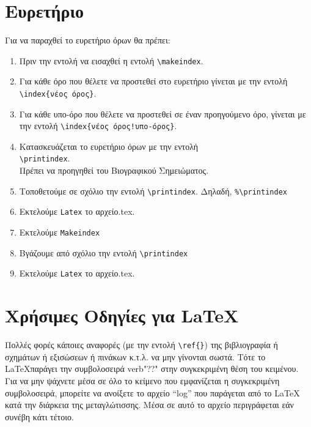 \color{red}
\section{Ευρετήριο}
\label{sec:Index}

Για να παραχθεί το ευρετήριο όρων θα πρέπει:

\begin{enumerate}
  \item Πριν την εντολή \verb"" να εισαχθεί η
  εντολή \verb"\makeindex".
  \item Για κάθε όρο που θέλετε να προστεθεί στο ευρετήριο γίνεται
  με την εντολή \verb"\index{νέος όρος}".
  \item Για κάθε υπο-όρο που θέλετε να προστεθεί σε έναν προηγούμενο όρο, γίνεται
  με την εντολή \verb"\index{νέος όρος!υπο-όρος}".
  \item Κατασκευάζεται το ευρετήριο όρων με την εντολή\\
  \verb"\printindex". \\Πρέπει να προηγηθεί του Βιογραφικού
  Σημειώματος.
  \item Τοποθετούμε σε σχόλιο την εντολή
  \verb"\printindex". Δηλαδή,
  \verb"%\printindex"
  \item Εκτελούμε
  \verb"Latex" το αρχείο.tex.
  \item Εκτελούμε
  \verb"Makeindex"
  \item Βγάζουμε από σχόλιο την εντολή
  \verb"\printindex"
  \item Εκτελούμε
  \verb"Latex" το αρχείο.tex.
\end{enumerate}






\section{Χρήσιμες Οδηγίες για \LaTeX}
\label{sec:LaTeX}

Πολλές φορές κάποιες αναφορές (με την εντολή \verb"\ref{}") της
βιβλιογραφία ή σχημάτων ή εξισώσεων ή πινάκων κ.τ.λ. να μην
γίνονται σωστά. Τότε το \LaTeX παράγει την συμβολοσειρά verb"??"
στην συγκεκριμένη θέση του κειμένου. Για να μην ψάχνετε μέσα σε
όλο το κείμενο που εμφανίζεται η συγκεκριμένη συμβολοσειρά,
μπορείτε να ανοίξετε το αρχείο ``log'' που παράγεται από το \LaTeX
κατά την διάρκεια της μεταγλώτισσης. Μέσα σε αυτό το αρχείο
περιγράφεται εάν συνέβη κάτι τέτοιο.
\color{black}